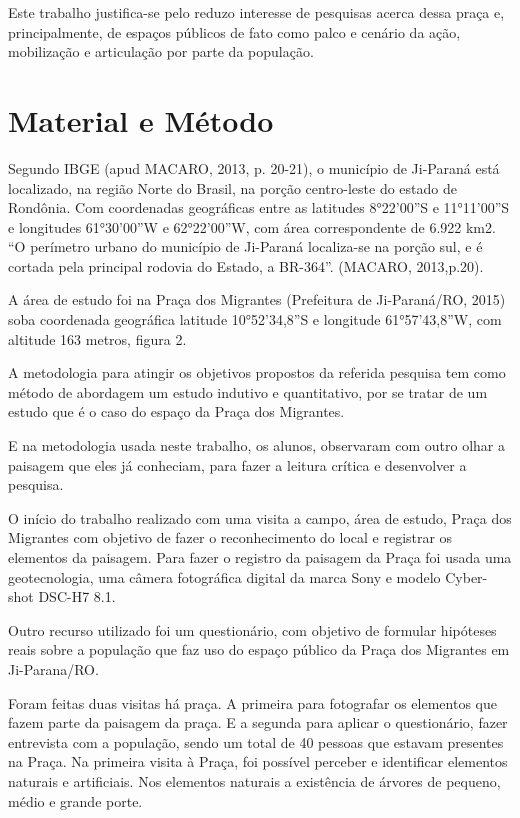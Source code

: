 \documentclass[article,12pt,onesidea,4paper,english,brazil]{abntex2}
\begin{document}
	Este trabalho justifica-se pelo reduzo interesse de pesquisas acerca dessa praça e, principalmente, de espaços públicos de fato como palco e cenário da ação, mobilização e articulação por parte da população.
	
	
	\section*{Material e Método}
	
	Segundo IBGE (apud MACARO, 2013, p. 20-21), o município de Ji-Paraná está localizado, na região Norte do Brasil, na porção centro-leste do estado de Rondônia. Com coordenadas geográficas entre as latitudes 8°22’00”S e 11°11’00”S e longitudes 61°30’00”W e 62°22’00”W, com área correspondente de 6.922 km2. “O perímetro urbano do município de Ji-Paraná localiza-se na porção sul, e é cortada pela principal rodovia do Estado, a BR-364”. (MACARO, 2013,p.20).
	
	A área de estudo foi na Praça dos Migrantes (Prefeitura de Ji-Paraná/RO, 2015) soba coordenada geográfica latitude 10°52’34,8”S e longitude 61°57’43,8”W, com altitude 163 metros, figura 2.
	
	A metodologia para atingir os objetivos propostos da referida pesquisa tem como método de abordagem um estudo indutivo e quantitativo, por se tratar de um estudo que é o caso do espaço da Praça dos Migrantes.
	
	E na metodologia usada neste trabalho, os alunos, observaram com outro olhar a paisagem que eles já conheciam, para fazer a leitura crítica e desenvolver a pesquisa.
	
	O início do trabalho realizado com uma visita a campo, área de estudo, Praça dos Migrantes com objetivo de fazer o reconhecimento do local e registrar os elementos da paisagem. Para fazer o registro da paisagem da Praça foi usada uma geotecnologia, uma câmera fotográfica digital da marca Sony e modelo Cyber-shot DSC-H7 8.1.
	
	Outro recurso utilizado foi um questionário, com objetivo de formular hipóteses reais sobre a população que faz uso do espaço público da Praça dos Migrantes em Ji-Parana/RO.
	
	Foram feitas duas visitas há praça. A primeira para fotografar os elementos que fazem parte da paisagem da praça. E a segunda para aplicar o questionário, fazer entrevista com a população, sendo um total de 40 pessoas que estavam presentes na Praça.
	Na primeira visita à Praça, foi possível perceber e identificar elementos naturais e artificiais. Nos elementos naturais a existência de árvores de pequeno, médio e grande porte.
	
\end{document}
